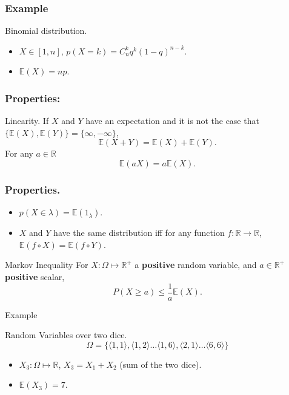 \documentclass{beamer}
\begin{document}
\begin{frame}
  \frametitle{Example}
  \begin{exampleblock}{Binomial distribution.}
    \begin{itemize}
    \item $X \in [1,n]$, $p(X = k) = C^k_n q^k(1-q)^{n-k}$.
    \item $\mathbb{E}(X) = np$.
    \end{itemize}
  \end{exampleblock}
\end{frame}

\begin{frame}
  \frametitle{Properties:}
  \begin{block}{Linearity.}
    If $X$ and $Y$ have an expectation and it is not the case that $\{\mathbb{E}(X), \mathbb{E}(Y)\} = \{\infty, {-}\infty\}$,
    \[ \mathbb{E}(X + Y) = \mathbb{E}(X) + \mathbb{E}(Y). \]
    For any $a \in \mathbb{R}$
    \[\mathbb{E}(aX) = a\mathbb{E}(X).\]
  \end{block}
\end{frame}

\begin{frame}
  \frametitle{Properties.}
  \begin{itemize}
  \item $p(X \in \lambda) = \mathbb{E}(1_{\lambda})$.
  \item $X$ and $Y$ have the same distribution iff for any function $f: \mathbb{R} \rightarrow \mathbb{R}$, $\mathbb{E}(f \circ X) = \mathbb{E}(f \circ Y)$.
  \end{itemize}

  \begin{block}{Markov Inequality}
      For $X: \Omega \mapsto \mathbb{R}^{+}$ a {\bf positive} random variable, and $a \in \mathbb{R}^{+}$ {\bf positive} scalar,
      \[P(X \ge a) \le \frac{1}{a}\mathbb{E}(X).\]
  \end{block}
  
\end{frame}

\begin{frame}{Example}
  \begin{exampleblock}{Random Variables over two dice.}
    \[\Omega = \{\langle 1,1 \rangle, \langle 1,2 \rangle \dots \langle 1,6 \rangle, \langle 2,1 \rangle \dots \langle 6,6 \rangle\}\]
    \begin{itemize}
    \item $X_3: \Omega \mapsto \mathbb{R}$, $X_3 = X_1 + X_2$ (sum of the two dice).
    \item $\mathbb{E}(X_3) = 7$.
    \end{itemize}
  \end{exampleblock}
\end{frame}
\end{document}
